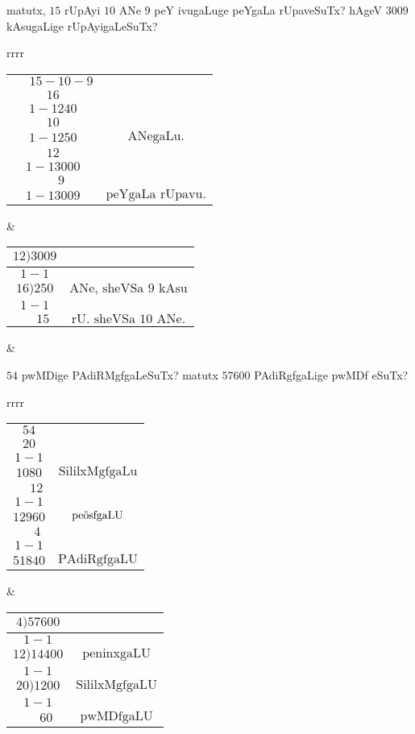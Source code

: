 matutx,
$15$ rUpAyi $10$ ANe $9$ peY ivugaLuge peYgaLa rUpaveSuTx?
hAgeV $3009$ kAsugaLige rUpAyi\-gaLeSuTx?

\begin{center}
\begin{tabular}{rrrr}
\begin{tabular}{>{$}c<{$}>{$}c<{$}}
\quad\;15-10-9\\
16\\
\cline{1-1}
240 &\\
10 &\\
\cline{1-1}
250 & \text{ANegaLu.}\\
12\\
\cline{1-1}
3000\\
\quad\;9\\
\cline{1-1}
3009 & \text{peYgaLa rUpavu.}
\end{tabular} &

\begin{tabular}{>{$}c<{$}>{$}c<{$}}
12)3009 &\\
\cline{1-1}\\
16)250 & \text{ANe, sheVSa $9$ kAsu}\\
\cline{1-1}\\
\quad\; 15 & \text{rU. sheVSa $10$ ANe.}\\
\end{tabular} & 
\end{tabular}

\smallskip

\end{center}

$54$ pwMDige PAdiRMgfgaLeSuTx? matutx $57600$ PAdiRgfgaLige pwMDf eSuTx?

\begin{tabular}{rrrr}
\begin{tabular}{>{$}c<{$}>{$}c<{$}}
54\\
20\\
\cline{1-1}\\
1080 &\text{SililxMgfgaLu}\\
\quad\,12\\
\cline{1-1}\\
12960 & \text{pe\char'366sfgaLU}\\
\quad\; 4\\
\cline{1-1}\\
51840 & \text{PAdiRgfgaLU}
\end{tabular} &

\begin{tabular}{>{$}c<{$}>{$}c<{$}}
4)57600\\
\cline{1-1}\\
12)14400 & \text{peninxgaLU}\\
\cline{1-1}\\
20)1200 & \text{SililxMgfgaLU}\\
\cline{1-1}\\
\quad\; 60& \text{pwMDfgaLU}
\end{tabular} 
\end{tabular}

